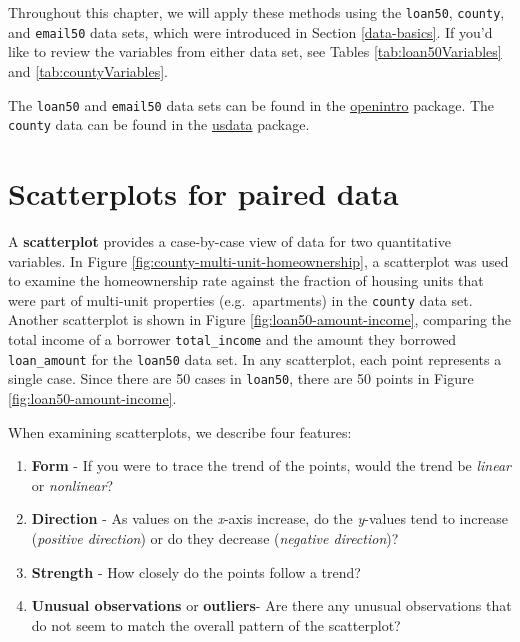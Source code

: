 \documentclass[
  10pt,
  openany]{book}
\providecommand{\tightlist}{%
  \setlength{\itemsep}{0pt}\setlength{\parskip}{0pt}}
\theoremstyle{definition}
\theoremstyle{definition}
\theoremstyle{definition}
\theoremstyle{definition}
\theoremstyle{remark}
\begin{document}
Throughout this chapter, we will apply these methods using the \texttt{loan50}, \texttt{county}, and \texttt{email50} data sets, which were introduced in Section \ref{data-basics}.
If you'd like to review the variables from either data set, see Tables \ref{tab:loan50Variables} and \ref{tab:countyVariables}.

The \texttt{loan50} and \texttt{email50} data sets can be found in the \href{http://openintrostat.github.io/openintro}{openintro} package.
The \texttt{county} data can be found in the \href{https://openintrostat.github.io/usdata/}{usdata} package.

\section{Scatterplots for paired data}\label{scatterplots}


A \textbf{scatterplot} provides a case-by-case view of data for two quantitative variables.
In Figure \ref{fig:county-multi-unit-homeownership}, a scatterplot was used to examine the homeownership rate against the fraction of housing units that were part of multi-unit properties (e.g.~apartments) in the \texttt{county} data set.
Another scatterplot is shown in Figure \ref{fig:loan50-amount-income}, comparing the total income of a borrower \texttt{total\_income} and the amount they borrowed \texttt{loan\_amount} for the \texttt{loan50} data set.
In any scatterplot, each point represents a single case.
Since there are 50 cases in \texttt{loan50}, there are 50 points in Figure \ref{fig:loan50-amount-income}.

When examining scatterplots, we describe four features:

\begin{enumerate}
\def\labelenumi{\arabic{enumi}.}
\tightlist
\item
  \textbf{Form} - If you were to trace the trend of the points,
  would the trend be \emph{linear} or \emph{nonlinear}?
\item
  \textbf{Direction} - As values on the \emph{x}-axis increase, do the \emph{y}-values
  tend to increase (\emph{positive direction}) or do they decrease (\emph{negative direction})?
\item
  \textbf{Strength} - How closely do the points follow a trend?
\item
  \textbf{Unusual observations} or \textbf{outliers}- Are there any unusual observations
  that do not seem to match the overall pattern of the scatterplot?
\end{enumerate}
\end{document}
